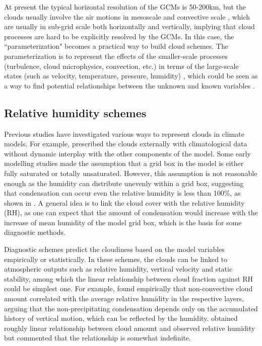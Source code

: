 At present the typical horizontal resolution of the GCMs is 50-200km, but the clouds usually involve the air motions in mesoscale and convective scale \citep{Houze2014}, which are usually in sub-grid scale both horizontally and vertically, implying that cloud processes are hard to be explicitly resolved by the GCMs. In this case, the ``parameterization" becomes a practical way to build cloud schemes. The parameterization is to represent the effects of the smaller-scale processes (turbulence, cloud microphysics, convection, etc.) in terms of the large-scale states (such as velocity, temperature, pressure, humidity) \citep{Randall2003}, which could be seen as a way to find potential relationships between the unknown and known variables \citep{Randall1989}.

\subsection{Relative humidity schemes}
Previous studies have investigated various ways to represent clouds in climate models. For example, \cite{Holloway1971} prescribed the clouds externally with climatological data without dynamic interplay with the other components of the model. Some early modelling studies made the assumption that a grid box in the model is either fully saturated or totally unsaturated. However, this assumption is not reasonable enough as the humidity can distribute unevenly within a grid box, suggesting that condensation can occur even the relative humidity is less than 100\%, as shown in . A general idea is to link the cloud cover with the relative humidity (RH), as one can expect that the amount of condensation would increase with the increase of mean humidity of the model grid box, which is the basis for some diagnostic methods.

Diagnostic schemes predict the cloudiness based on the model variables empirically or statistically. In these schemes, the clouds can be linked to atmospheric outputs such as relative humidity, vertical velocity and static stability, among which the linear relationship between cloud fraction against RH could be simplest one. For example, \cite{Smagorinsky1960} found empirically that non-convective cloud amount correlated with the average relative humidity in the respective layers, arguing that the non-precipitating condensation depends only on the accumulated history of vertical motion, which can be reflected by the humidity. \cite{Ricketts1973} obtained roughly linear relationship between cloud amount and observed relative humidity but commented that the relationship is somewhat indefinite.

